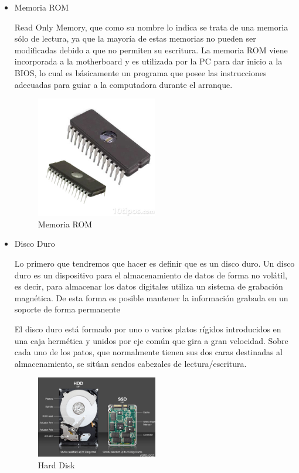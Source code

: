\documentclass{article}
\begin{document}
\begin{itemize}
    \item Memoria ROM
    
    Read Only Memory, que como su nombre lo indica se trata de una memoria sólo de lectura, ya que la mayoría de estas memorias no pueden ser modificadas debido a que no permiten su escritura.
     La memoria ROM viene incorporada a la motherboard y es utilizada por la PC para dar inicio a la BIOS, lo cual es básicamente un programa que posee las instrucciones adecuadas para guiar a la computadora durante el arranque.

\begin{figure}[h]
    \centering
    \includegraphics[width=0.5\textwidth]{rom.jpg}
    \caption{Memoria ROM}
    \label{fig:rom}
\end{figure}
\newpage

    \item Disco Duro
    
    Lo primero que tendremos que hacer es definir que es un disco duro. Un disco duro es un dispositivo para el almacenamiento de datos de forma no volátil, es decir, para almacenar los datos digitales utiliza un sistema de grabación magnética. De esta forma es posible mantener la información grabada en un soporte de forma permanente
    
    El disco duro está formado por uno o varios platos rígidos introducidos en una caja hermética y unidos por eje común que gira a gran velocidad. Sobre cada uno de los patos, que normalmente tienen sus dos caras destinadas al almacenamiento, se sitúan sendos cabezales de lectura/escritura.
    
    \begin{figure}[h]
        \centering
        \includegraphics[width=0.5\textwidth]{disco.jpg}
        \caption{Hard Disk}
        \label{fig:disk}
    \end{figure}
    
    
    \end{itemize}
    
\end{document}
